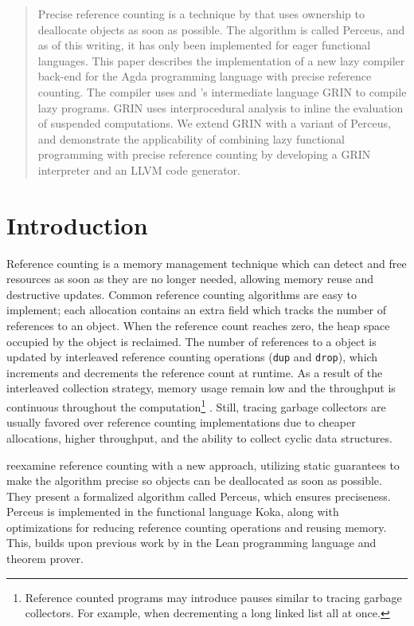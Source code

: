 \documentclass[10pt, twocolumn]{article}
\begin{document}
\begin{abstract}
Precise reference counting is a technique by \citeauthor{reinking2021} that uses ownership to deallocate objects as soon as possible. 
The algorithm is called Perceus, and as of this writing, it has only been implemented for eager functional languages.
This paper describes the implementation of a new lazy compiler back-end for the Agda programming language with 
precise reference counting. 
The compiler uses \citeauthor{boquist1999} and \citeauthor{johnsson1991}'s intermediate language GRIN to compile lazy programs. 
GRIN uses interprocedural analysis to inline the evaluation of suspended computations.
We extend GRIN with a variant of Perceus, and demonstrate the applicability of combining lazy functional programming with precise reference counting by developing a GRIN interpreter and an LLVM code generator. 

\end{abstract}

\section{Introduction}

Reference counting \citep{collins1960} is a memory management technique which can detect and free resources as soon as they are no longer needed, allowing memory reuse and destructive updates. 
Common reference counting algorithms are easy to implement; each allocation contains an extra field which tracks the number of references to an object. 
When the reference count reaches zero, the heap space occupied by the object is reclaimed.
The number of references to a object is updated by interleaved reference counting operations (\texttt{dup} and \texttt{drop}), which increments and decrements the reference count at runtime. 
As a result of the interleaved collection strategy, memory usage remain low and the throughput is continuous throughout the computation\footnote{Reference counted programs may introduce pauses similar to tracing garbage collectors. For example, when decrementing a long linked list all at once.} \citep{jones1996}.
Still, tracing garbage collectors are usually favored over reference counting implementations due to cheaper allocations, higher throughput, and the ability to collect cyclic data structures.

\citet{reinking2021} reexamine reference counting with a new approach, utilizing static guarantees to make the algorithm precise so objects can be deallocated as soon as possible.
They present a formalized algorithm called Perceus, which ensures preciseness. 
Perceus is implemented in the functional language Koka, along with optimizations for reducing reference counting operations and reusing memory.
This, builds upon previous work by \citet{ullrich2021} in the Lean programming language and theorem prover. 
\end{document}
